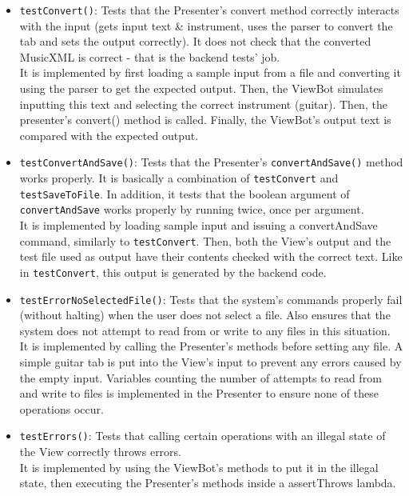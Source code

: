 \documentclass[11pt]{article}
\begin{document}
\begin{itemize}
\item \texttt{testConvert()}: Tests that the Presenter's convert method correctly interacts with the input (gets input text \& instrument, uses the parser to convert the tab and sets the output correctly).  It does not check that the converted MusicXML is correct - that is the backend tests' job.\\
It is implemented by first loading a sample input from a file and converting it using the parser to get the expected output.  Then, the ViewBot simulates inputting this text and selecting the correct instrument (guitar).  Then, the presenter's convert() method is called.  Finally, the ViewBot's output text is compared with the expected output.\\
\item \texttt{testConvertAndSave()}: Tests that the Presenter's \texttt{convertAndSave()} method works properly.  It is basically a combination of \texttt{testConvert} and \texttt{testSaveToFile}.  In addition, it tests that the boolean argument of \texttt{convertAndSave} works properly by running twice, once per argument.\\
It is implemented by loading sample input and issuing a convertAndSave command, similarly to \texttt{testConvert}.  Then, both the View's output and the test file used as output have their contents checked with the correct text.  Like in \texttt{testConvert}, this output is generated by the backend code.\\
\item \texttt{testErrorNoSelectedFile()}: Tests that the system's commands properly fail (without halting) when the user does not select a file.  Also ensures that the system does not attempt to read from or write to any files in this situation.\\
It is implemented by calling the Presenter's methods before setting any file.  A simple guitar tab is put into the View's input to prevent any errors caused by the empty input.  Variables counting the number of attempts to read from and write to files is implemented in the Presenter to ensure none of these operations occur.\\
\item \texttt{testErrors()}: Tests that calling certain operations with an illegal state of the View correctly throws errors.\\
It is implemented by using the ViewBot's methods to put it in the illegal state, then executing the Presenter's methods inside a assertThrows lambda.\\

\end{itemize}
\end{document}
